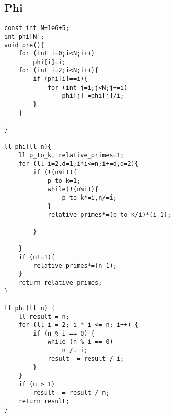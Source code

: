 \documentclass{article}
\begin{document}
\subsection{Phi}
\begin{verbatim}
const int N=1e6+5;
int phi[N];
void pre(){
    for (int i=0;i<N;i++)
        phi[i]=i;
    for (int i=2;i<N;i++){
        if (phi[i]==i){
            for (int j=i;j<N;j+=i)
                phi[j]-=phi[j]/i;
        }
    }

}

ll phi(ll n){
    ll p_to_k, relative_primes=1;
    for (ll i=2,d=1;i*i<=n;i+=d,d=2){
        if (!(n%i)){
            p_to_k=1;
            while(!(n%i)){
                p_to_k*=i,n/=i;
            }
            relative_primes*=(p_to_k/i)*(i-1);

        }

    }
    if (n!=1){
        relative_primes*=(n-1);
    }
    return relative_primes;
}

ll phi(ll n) {
    ll result = n;
    for (ll i = 2; i * i <= n; i++) {
        if (n % i == 0) {
            while (n % i == 0)
                n /= i;
            result -= result / i;
        }
    }
    if (n > 1)
        result -= result / n;
    return result;
}
\end{verbatim}
\end{document}
